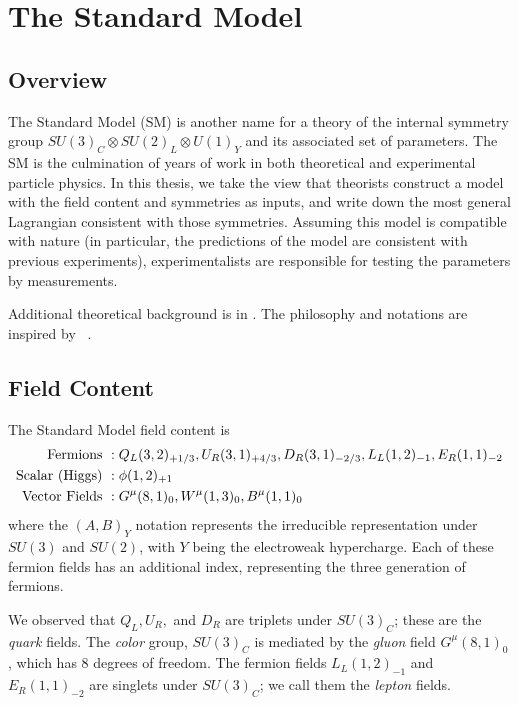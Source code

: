 \chapter{The Standard Model}\label{ch:sm}

\section{Overview}

The Standard Model (SM) is another name for a theory of the internal symmetry group $SU(3)_C \otimes SU(2)_L \otimes U(1)_Y$ and its associated set of parameters.
The SM is the culmination of years of work in both theoretical and experimental particle physics.
In this thesis, we take the view that theorists construct a model with the field content and symmetries as inputs, and write down the most general Lagrangian consistent with those symmetries.
Assuming this model is compatible with nature (in particular, the predictions of the model are consistent with previous experiments), experimentalists are responsible for testing the parameters by measurements.

Additional theoretical background is in .
The philosophy and notations are inspired by ~\cite{yuvalSMLectures, Buchmuller:984122}.

\section{Field Content}\label{sec:field_content}

The Standard Model field content is
\begin{align}
\text{Fermions }       &:  Q_L(3,2)_{+1/3}, \xspace  U_R(3,1)_{+4/3},\xspace  D_R(3,1)_{-2/3} ,\xspace  L_L(1,2)_{-1} ,\xspace  E_R(1,1)_{-2} \notag \\
\text{Scalar (Higgs) } &:  \phi(1,2)_{+1} \\
\text{Vector Fields }  &:  G^\mu(8,1)_0 , \xspace W^\mu(1,3)_0 , \xspace B^\mu(1,1)_0 \notag
\end{align}
where the $(A, B)_Y$ notation represents the irreducible representation under $SU(3)$ and $SU(2)$, with $Y$ being the electroweak hypercharge.
Each of these fermion fields has an additional index, representing the three generation of fermions.

We observed that $Q_L, U_R,$ and $D_R$ are triplets under $SU(3)_C$; these are the \textit{quark} fields.
The \textit{color} group, $SU(3)_C$ is mediated by the \textit{gluon} field $G^\mu(8,1)_0$, which has 8 degrees of freedom.
The fermion fields $L_L(1,2)_{-1}$ and $  E_R(1,1)_{-2} $ are singlets under $SU(3)_C$; we call them the \textit{lepton} fields.

